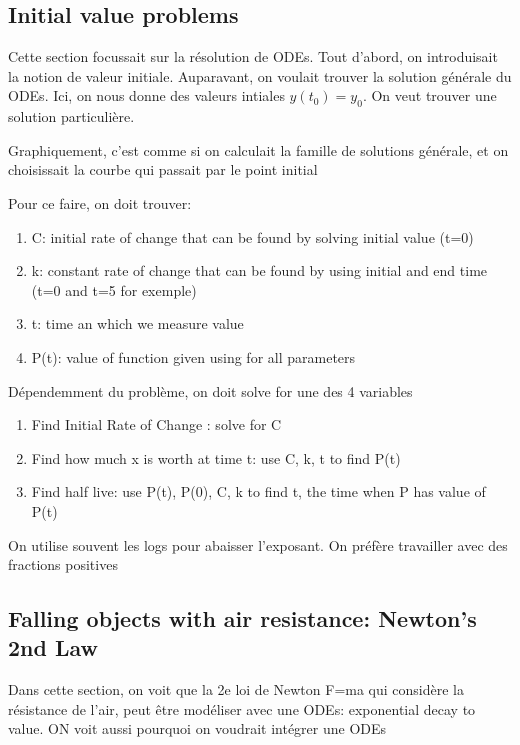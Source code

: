 \documentclass{article}
\begin{document}
\subsection{Initial value problems}

Cette section focussait sur la résolution de ODEs. Tout d'abord, on
introduisait la notion de valeur initiale. Auparavant, on voulait
trouver la solution générale du ODEs. Ici, on nous donne des valeurs
intiales $ y(t_0) = y_0 $. On veut trouver une solution particulière.

\begin{intuition}
    Graphiquement, c'est comme si on calculait la famille de solutions
    générale, et on choisissait la courbe qui passait par le point initial
\end{intuition}

Pour ce faire, on doit trouver:
\begin{enumerate}
    \item C: initial rate of change that can be found by solving
	initial value (t=0)
    \item k: constant rate of change that can be found by using
	initial and end time (t=0 and t=5 for exemple)
    \item t: time an which we measure value
    \item P(t): value of function given using for all parameters
\end{enumerate}

Dépendemment du problème, on doit solve for une des 4 variables
\begin{enumerate}
    \item Find Initial Rate of Change : solve for C
    \item Find how much x is worth at time t: use C, k, t to find P(t)
    \item Find half live: use P(t), P(0), C, k to find t, the time when
	P has value of P(t)
\end{enumerate}

\begin{remark}
    On utilise souvent les logs pour abaisser l'exposant. On préfère
    travailler avec des fractions positives
\end{remark}

\subsection{Falling objects with air resistance: Newton's 2nd Law}

Dans cette section, on voit que la 2e loi de Newton F=ma qui considère
la résistance de l'air, peut être modéliser avec une ODEs: exponential
decay to value. ON voit aussi pourquoi on voudrait intégrer une ODEs
\end{document}
